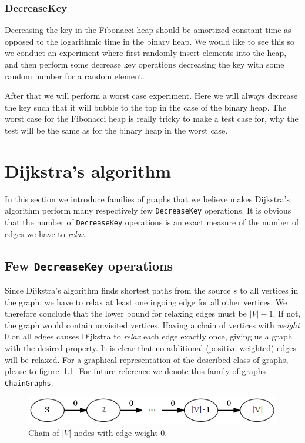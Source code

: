 \documentclass[a4paper,oneside,article,11pt]{memoir}
\begin{document}
\subsection{DecreaseKey}
Decreasing the key in the Fibonacci heap should be amortized constant time as opposed to the logarithmic time in the binary heap. We would like to see this so we conduct an experiment where first randomly insert elements into the heap, and then perform some decrease key operations decreasing the key with some random number for a random element.

After that we will perform a worst case experiment. Here we will always decrease the key such that it will bubble to the top in the case of the binary heap. The worst case for the Fibonacci heap is really tricky to make a test case for, why the test will be the same as for the binary heap in the worst case.



\chapter{Dijkstra's algorithm}
In this section we introduce families of graphs that we believe makes Dijkstra's algorithm perform many respectively few \texttt{DecreaseKey} operations. It is obvious that the number of \texttt{DecreaseKey} operations is an exact measure of the number of edges we have to \textit{relax}.

\section{Few \texttt{DecreaseKey} operations}
\label{sec:few_decreasekey}
Since Dijkstra's algorithm finds shortest paths from the source $s$ to all vertices in the graph, we have to relax at least one ingoing edge for all other vertices. We therefore conclude that the lower bound for relaxing edges must be $\vert V \vert -1$. If not, the graph would contain unvisited vertices. Having a chain of vertices with \textit{weight} 0 on all edges causes Dijkstra to \textit{relax} each edge exactly once, giving us a graph with the desired property. It is clear that no additional (positive weighted) edges will be relaxed. For a graphical representation of the described class of graphs, please to figure~\ref{figure:graph_chain}. For future reference we denote this family of graphs \texttt{ChainGraphs}.

\begin{figure}[H]
\centering
\centerline {
  \includegraphics[scale=1]{../figures/graph_chain.png}
}
\caption{Chain of $\vert V \vert$ nodes with edge weight 0.}
\label{figure:graph_chain}
\end{figure}
\end{document}
